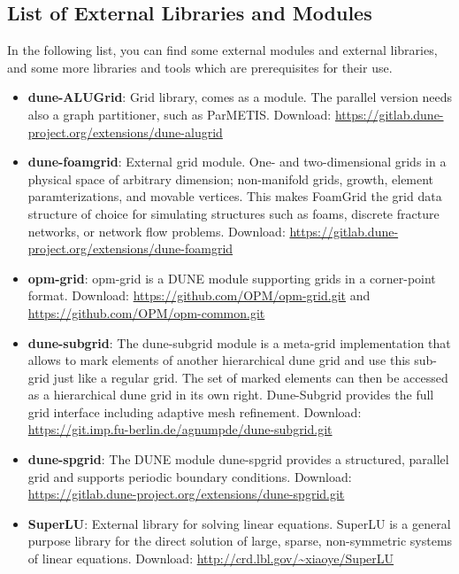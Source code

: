 \subsection{List of External Libraries and Modules}
\label{sec:listofexternallibs}

In the following list, you can find some external modules and external libraries,
and some more libraries and tools which are prerequisites for their use.

\begin{itemize}
\item \textbf{dune-ALUGrid}: Grid library, comes as a \Dune module.
  The parallel version needs also a graph partitioner, such as {ParMETIS}.
  Download: \url{https://gitlab.dune-project.org/extensions/dune-alugrid}

\item \textbf{dune-foamgrid}: External grid module. One- and two-dimensional grids
  in a physical space of arbitrary dimension; non-manifold grids, growth, element
  paramterizations, and movable vertices. This makes FoamGrid the grid data structure
  of choice for simulating structures such as foams, discrete fracture networks,
  or network flow problems.
  Download: \url{https://gitlab.dune-project.org/extensions/dune-foamgrid}

\item \textbf{opm-grid}: opm-grid is a DUNE module supporting grids in a corner-point format.
  Download: \url{https://github.com/OPM/opm-grid.git} and \url{https://github.com/OPM/opm-common.git}

\item \textbf{dune-subgrid}: The dune-subgrid module is a meta-grid implementation that allows
to mark elements of another hierarchical dune grid and use this sub-grid just like a regular grid.
The set of marked elements can then be accessed as a hierarchical dune grid in its own right.
Dune-Subgrid provides the full grid interface including adaptive mesh refinement.
  Download: \url{https://git.imp.fu-berlin.de/agnumpde/dune-subgrid.git}

\item \textbf{dune-spgrid}: The DUNE module dune-spgrid provides a structured, parallel grid
and supports periodic boundary conditions.
  Download: \url{https://gitlab.dune-project.org/extensions/dune-spgrid.git}

\item \textbf{SuperLU}: External library for solving linear equations. SuperLU is a general purpose
  library for the direct solution of large, sparse, non-symmetric systems of linear equations.
  Download: \url{http://crd.lbl.gov/~xiaoye/SuperLU}


\end{itemize}
